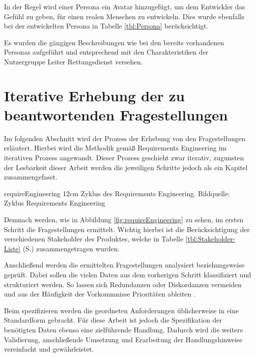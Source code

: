 In der Regel wird einer Persona ein Avatar hinzugefügt, um dem Entwickler das Gefühl zu geben, für einen realen Menschen zu entwickeln. 
Dies wurde ebenfalls bei der entwickelten Persona in Tabelle \ref{tbl:Persona} berücksichtigt.


Es wurden die gängigen Beschreibungen wie bei den bereits vorhandenen Personas aufgeführt und entsprechend mit den Charakteristiken der Nutzergruppe \glqq Leiter Rettungsdienst\grqq{} versehen.

\section{Iterative Erhebung der zu beantwortenden Fragestellungen}
\label{sec:erhebung}
Im folgenden Abschnitt wird der Prozess der Erhebung von den Fragestellungen erläutert.
Hierbei wird die Methodik gemäß Requirements Engineering \cite{Pohl.2011} im iterativen Prozess angewandt.
Dieser Prozess geschieht zwar iterativ, zugunsten der Lesbarkeit dieser Arbeit werden die jeweiligen Schritte jedoch als ein Kapitel zusammengefasst.

\bild
{requireEngineering}
{12cm}
{Zyklus des Requirements Engineering. Bildquelle: \cite{Patig.}}
{Zyklus Requirements Engineering}

Demnach werden, wie in Abbildung \ref{fig:requireEngineering} zu sehen, im ersten Schritt die Fragestellungen ermittelt.
Wichtig hierbei ist die Berücksichtigung der verschiedenen Stakeholder des Produktes, welche in Tabelle \ref{tbl:Stakeholder-Liste} (S.\pageref{tbl:Stakeholder-Liste}) zusammengetragen wurden.

Anschließend werden die ermittelten Fragestellungen analysiert beziehungsweise geprüft.
Dabei sollen die vielen Daten aus dem vorherigen Schritt klassifiziert und strukturiert werden.
So lassen sich Redundanzen oder Diskordanzen vermeiden und aus der Häufigkeit der Vorkommnisse Prioritäten ableiten \cite[S.100f]{Sommerville.2012}.

Beim spezifizieren werden die geordneten Anforderungen üblicherweise in eine Standardform gebracht.
Für diese Arbeit ist jedoch die Spezifikation der benötigten Daten ebenso eine zielführende Handlung.
Dadurch wird die weitere Validierung, anschließende Umsetzung und Erarbeitung der Handlungshinweise vereinfacht und gewährleistet.


